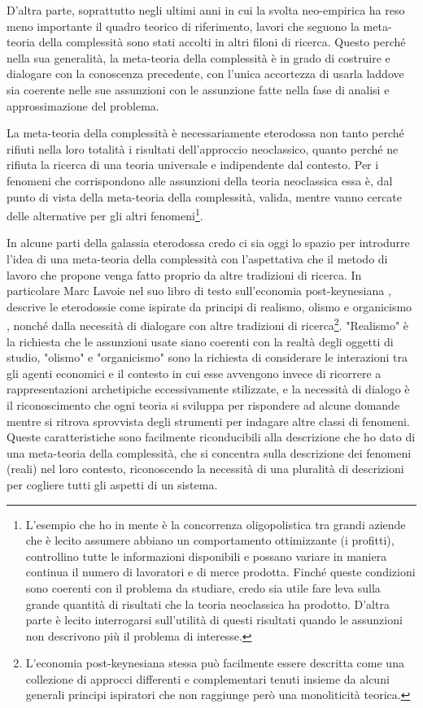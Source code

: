 \documentclass[a4paper, headings=standardclasses]{scrartcl}
\begin{document}
D'altra parte, soprattutto negli ultimi anni in cui la svolta neo-empirica ha reso meno importante il quadro teorico di riferimento, lavori che seguono la meta-teoria della complessità sono stati accolti in altri filoni di ricerca.
Questo perché nella sua generalità, la meta-teoria della complessità è in grado di costruire e dialogare con la conoscenza precedente, con l'unica accortezza di usarla laddove sia coerente nelle sue assunzioni con le assunzione fatte nella fase di analisi e approssimazione del problema.

La meta-teoria della complessità è necessariamente eterodossa \parencite{fontana2010} non tanto perché rifiuti nella loro totalità i risultati dell'approccio neoclassico, quanto perché ne rifiuta la ricerca di una teoria universale e indipendente dal contesto.
Per i fenomeni che corrispondono alle assunzioni della teoria neoclassica essa è, dal punto di vista della meta-teoria della complessità, valida, mentre vanno cercate delle alternative per gli altri fenomeni\footnote{L'esempio che ho in mente è la concorrenza oligopolistica tra grandi aziende che è lecito assumere abbiano un comportamento ottimizzante (i profitti), controllino tutte le informazioni disponibili e possano variare in maniera continua il numero di lavoratori e di merce prodotta. Finché queste condizioni sono coerenti con il problema da studiare, credo sia utile fare leva sulla grande quantità di risultati che la teoria neoclassica ha prodotto. D'altra parte è lecito interrogarsi sull'utilità di questi risultati quando le assunzioni non descrivono più il problema di interesse.}.

In alcune parti della galassia eterodossa credo ci sia oggi lo spazio per introdurre l'idea di una meta-teoria della complessità con l'aspettativa che il metodo di lavoro che propone venga fatto proprio da altre tradizioni di ricerca.
In particolare Marc Lavoie nel suo libro di testo sull'economia post-keynesiana \parencite{lavoie2022}, descrive le eterodossie come ispirate da principi di realismo, olismo e organicismo \parencite[][p. 12]{lavoie2022}, nonché dalla necessità di dialogare con altre tradizioni di ricerca\footnote{L'economia post-keynesiana stessa può facilmente essere descritta come una collezione di approcci differenti e complementari tenuti insieme da alcuni generali principi ispiratori che non raggiunge però una monoliticità teorica.}. "Realismo" è la richiesta che le assunzioni usate siano coerenti con la realtà degli oggetti di studio, "olismo" e "organicismo" sono la richiesta di considerare le interazioni tra gli agenti economici e il contesto in cui esse avvengono invece di ricorrere a rappresentazioni archetipiche eccessivamente stilizzate, e la necessità di dialogo è il riconoscimento che ogni teoria si sviluppa per rispondere ad alcune domande mentre si ritrova sprovvista degli strumenti per indagare altre classi di fenomeni.
Queste caratteristiche sono facilmente riconducibili alla descrizione che ho dato di una meta-teoria della complessità, che si concentra sulla descrizione dei fenomeni (reali) nel loro contesto, riconoscendo la necessità di una pluralità di descrizioni per cogliere tutti gli aspetti di un sistema.
\end{document}
